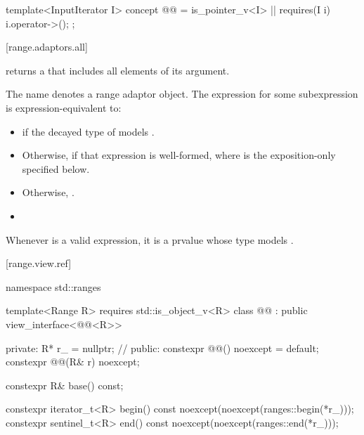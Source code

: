 \begin{addedblock}
\begin{codeblock}
template<InputIterator I>
  concept @@ =
    is_pointer_v<I> || requires(I i) { i.operator->(); };
\end{codeblock}

[range.adaptors.all]{}

\pnum
{} returns a  that includes all elements of
its  argument.

\pnum
The name  denotes a range adaptor
object. The expression  for
some subexpression  is expression-equivalent to:

\begin{itemize}
\item {} if the decayed type of 
models .

\item Otherwise,  if that
expression is well-formed, where 
is the exposition-only  specified below.

\item Otherwise,  .

\item {}
\end{itemize}

\begin{note}
Whenever  is a valid expression, it is a prvalue
whose type models .
\end{note}

[range.view.ref]{}

\begin{codeblock}
namespace std::ranges {
  template<Range R>
    requires std::is_object_v<R>
  class @@ : public view_interface<@@<R>> {
  private:
    R* r_ = nullptr; // \expos
  public:
    constexpr @@() noexcept = default;
    constexpr @@(R& r) noexcept;

    constexpr R& base() const;

    constexpr iterator_t<R> begin() const
      noexcept(noexcept(ranges::begin(*r_)));
    constexpr sentinel_t<R> end() const
      noexcept(noexcept(ranges::end(*r_)));

}}
\end{codeblock}
\end{addedblock}
